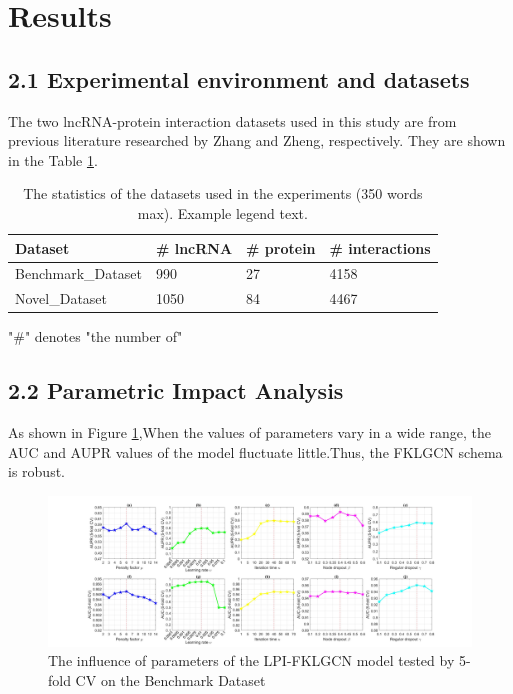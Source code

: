 \documentclass[fleqn,10pt]{wlscirep}
\begin{document}
\section*{Results}
\subsection*{2.1 Experimental environment and datasets}
The two lncRNA-protein interaction datasets used in this study are from previous literature researched by Zhang\cite{Zhang2018}  and Zheng\cite{Zheng2017a}, respectively. They are shown in the Table \ref{tab:datasets}.

\begin{table}[ht]
\centering
\caption{\label{tab:datasets} The statistics of the datasets used in the experiments (350 words max). Example legend text.}
\begin{threeparttable}[b]
\begin{tabular}{|l|l|l|l|}
\hline
Dataset & \# lncRNA & \# protein & \# interactions \\
\hline
Benchmark_Dataset & 990 & 27 & 4158\\
\hline
Novel_Dataset & 1050 & 84 & 4467 \\
\hline
\end{tabular}
\begin{tablenotes}
     \item "\#" denotes "the number of"
     \end{tablenotes}
     \end{threeparttable}
\end{table}

\subsection*{2.2 Parametric Impact Analysis}
As shown in Figure \ref{fig:fig2-1},When the values of parameters vary in a wide range, the AUC and AUPR values of the model fluctuate little.Thus, the FKLGCN schema is robust.

\begin{figure}[ht]
\centering
\graphicspath{ {./images/} }
\includegraphics[width=\textwidth]{fig1.jpg}
\caption{The influence of parameters of the LPI-FKLGCN model tested by 5-fold CV on the Benchmark Dataset}
\label{fig:fig2-1}
\end{figure}
\end{document}
